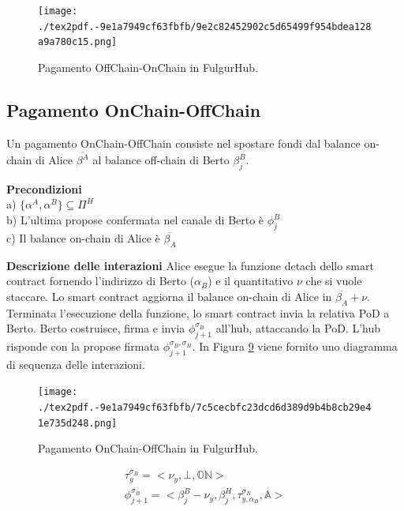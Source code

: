 \documentclass[12pt,italian,]{book}
\begin{document}
\begin{figure}
\centering
\texttt{[image: ./tex2pdf.-9e1a7949cf63fbfb/9e2c82452902c5d65499f954bdea128a9a780c15.png]}
\caption{\protect\hypertarget{caso-duso-offchain-onchain}{}{}Pagamento OffChain-OnChain in FulgurHub.}
\end{figure}

\hypertarget{pagamento-onchain-offchain}{%
\subsection{Pagamento OnChain-OffChain}\label{pagamento-onchain-offchain}}

Un pagamento OnChain-OffChain consiste nel spostare fondi dal balance on-chain di Alice \(\overline{\beta^A}\) al balance off-chain di Berto \(\beta^B_j\).

\textbf{\textbf{Precondizioni}}\\
a) \(\{\alpha^A, \alpha^B\} \subseteq \Pi^H\)\\
b) L'ultima propose confermata nel canale di Berto è \(\phi^B_j\)\\
c) Il balance on-chain di Alice è \(\overline{\beta_A}\)

\textbf{\textbf{Descrizione delle interazioni}} Alice esegue la funzione detach dello smart contract fornendo l'indirizzo di Berto (\(\alpha_B\)) e il quantitativo \(\nu\) che si vuole staccare. Lo smart contract aggiorna il balance on-chain di Alice in \(\overline{\beta_A}+\nu\). Terminata l'esecuzione della funzione, lo smart contract invia la relativa PoD a Berto. Berto costruisce, firma e invia \(\phi^{\sigma_B}_{j+1}\) all'hub, attaccando la PoD. L'hub risponde con la propose firmata \(\phi^{\sigma_B,\sigma_H}_{j+1}\). In Figura \protect\hyperlink{caso-duso-onchain-offchain}{9} viene fornito uno diagramma di sequenza delle interazioni.

\begin{figure}
\centering
\texttt{[image: ./tex2pdf.-9e1a7949cf63fbfb/7c5cecbfc23dcd6d389d9b4b8cb29e41e735d248.png]}
\caption{\protect\hypertarget{caso-duso-onchain-offchain}{}{}Pagamento OnChain-OffChain in FulgurHub.}
\end{figure}

\begin{equation}
\begin{aligned}
\label{Propose detach pagamento OnChain-OffChain}
\tau^{\sigma_B}_y =  <\nu_y, \bot, \mathbb{ON}> \\
\phi^{\sigma_B}_{j+1} = <\beta^B_j-\nu_y, \beta^H_j, \tau^{\sigma_B}_{y, \alpha_B} ,\mathbb{A}>
\end{aligned}
\end{equation}
\end{document}
